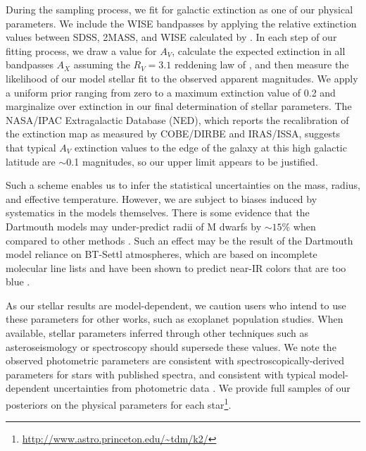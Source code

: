During the sampling process, we fit for galactic
extinction as one of our physical parameters.
We include the WISE bandpasses by applying the relative extinction values between
SDSS, 2MASS, and WISE calculated by \citet{Davenport14}.
In each step of our fitting process, we draw a value for $A_V$, calculate the expected extinction
in all bandpasses $A_X$ assuming the $R_V = 3.1$ reddening law of \citep{Fitzpatrick99}, 
and then measure the likelihood of our model stellar fit to the observed apparent magnitudes.
We apply a uniform prior ranging from zero to a maximum extinction value of 0.2 and
marginalize over extinction in our final determination of stellar parameters.
The NASA/IPAC Extragalactic Database (NED), which reports the
\citet{Schlafly11} recalibration of the \citet{Schlegel98} extinction map as measured by
COBE/DIRBE and IRAS/ISSA, suggests that typical $A_V$ extinction values to the edge
of the galaxy at this
high galactic latitude are $\sim$0.1 magnitudes, so our upper limit appears to be justified.

Such a scheme enables us to infer the statistical uncertainties on the
mass, radius, and effective temperature.
However, we are subject to biases induced by systematics in the models themselves.
There is some evidence that the Dartmouth models may under-predict
radii of M dwarfs by $\sim 15\%$ when compared to other methods \citep{Montet15a,
Newton15}.
Such an effect may be the result of the Dartmouth model reliance on BT-Settl
atmospheres, which are based on incomplete molecular line lists and
have been shown to predict near-IR colors that are too blue
\citep{Thompson14}.

As our stellar results are model-dependent, we caution users who intend to use these
parameters for other works, such as exoplanet population studies. When available,
stellar parameters inferred through other techniques such as asteroseismology or
spectroscopy should supersede these values.
We note the observed photometric parameters are consistent with spectroscopically-derived
parameters for stars with published spectra, and consistent with typical
model-dependent uncertainties
from photometric data \citep[e.g.][]{Huber14}.
We provide full samples of our posteriors on the physical parameters for each
star\footnote{\url{http://www.astro.princeton.edu/~tdm/k2/}}.

